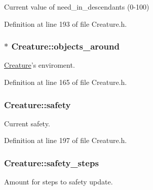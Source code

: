 Current value of need\-\_\-in\-\_\-descendants (0-\/100) 



Definition at line 193 of file Creature.\-h.

\hypertarget{classCreature_a2941f1bf4753c4cc196ca7b20ade706c}{
\subsubsection[{objects\-\_\-around}]{$\ast$ Creature\-::objects\-\_\-around\hspace{0.3cm}{\ttfamily [protected]}}}\label{classCreature_a2941f1bf4753c4cc196ca7b20ade706c}


\hyperlink{classCreature}{Creature}'s enviroment. 



Definition at line 165 of file Creature.\-h.

\hypertarget{classCreature_a898df2aff71e6908209969eea863ccf8}{
\subsubsection[{safety}]{ Creature\-::safety\hspace{0.3cm}{\ttfamily [protected]}}}\label{classCreature_a898df2aff71e6908209969eea863ccf8}


Current safety. 



Definition at line 197 of file Creature.\-h.

\hypertarget{classCreature_a0781a2fc0015b162482cc3f92aae3ec8}{
\subsubsection[{safety\-\_\-steps}]{ Creature\-::safety\-\_\-steps\hspace{0.3cm}{\ttfamily [protected]}}}\label{classCreature_a0781a2fc0015b162482cc3f92aae3ec8}


Amount for steps to safety update. 



